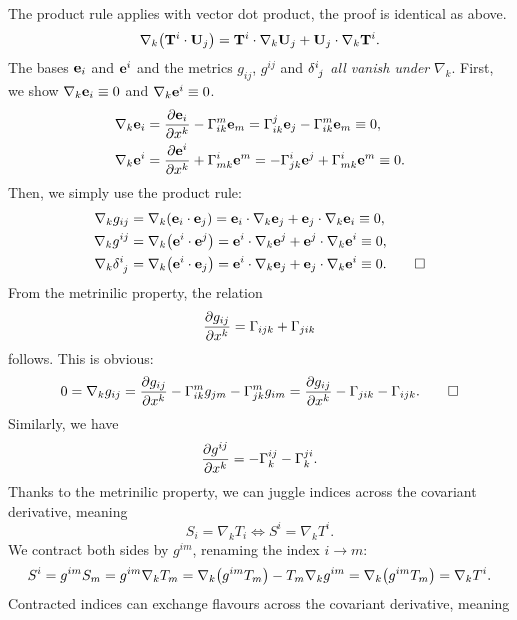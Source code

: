 \documentclass{article}
\begin{document}
 The product rule applies with vector dot product, the proof is identical as above.
\[
\nabla_{k} \qty(\vb{T}^{i} \cdot \vb{U}_{j}) = \vb{T}^{i} \cdot \nabla_{k} \vb{U}_{j} + \vb{U}_{j} \cdot \nabla_{k} \vb{T}^{i}.
\]
 The bases $ \vb{e}_{i} $ and $ \vb{e}^{i} $ and the metrics $ g_{ij} $, $ g^{ij} $ and $ \delta\indices{^{i}_{j}} $ \textit{all vanish under} $ \nabla_{k} $.
\proof First, we show $ \nabla_{k} \vb{e}_{i} \equiv 0 $ and $ \nabla_{k} \vb{e}^{i} \equiv 0 $.
\begin{align*}
\nabla_{k} \vb{e}_{i} &= \pdv{\vb{e}_{i}}{x^{k}} - \Gamma^{m}_{ik} \vb{e}_{m} 
= \Gamma^{j}_{ik} \vb{e}_{j} - \Gamma^{m}_{ik} \vb{e}_{m} \equiv 0, \\
\nabla_{k} \vb{e}^{i} &= \pdv{\vb{e}^{i}}{x^{k}} + \Gamma^{i}_{mk} \vb{e}^{m} 
= - \Gamma^{i}_{jk} \vb{e}^{j} + \Gamma^{i}_{mk} \vb{e}^{m}  \equiv 0.
\end{align*}
Then, we simply use the product rule:
\begin{align*}
\nabla_{k} g_{ij} &= \nabla_{k} \qty(\vb{e}_{i} \cdot \vb{e}_{j}) = \vb{e}_{i} \cdot \nabla_{k} \vb{e}_{j} + \vb{e}_{j} \cdot \nabla_{k} \vb{e}_{i} \equiv 0, \\
\nabla_{k} g^{ij} &= \nabla_{k} \qty(\vb{e}^{i} \cdot \vb{e}^{j}) = \vb{e}^{i} \cdot \nabla_{k} \vb{e}^{j} + \vb{e}^{j} \cdot \nabla_{k} \vb{e}^{i} \equiv 0, \\
\nabla_{k} \delta\indices{^{i}_{j}} &= \nabla_{k} \qty(\vb{e}^{i} \cdot \vb{e}_{j}) = \vb{e}^{i} \cdot \nabla_{k} \vb{e}_{j} + \vb{e}_{j} \cdot \nabla_{k} \vb{e}^{i} \equiv 0. \qed
\end{align*}
\proposition From the metrinilic property, the relation
\[
\pdv{g_{ij}}{x^{k}} = \Gamma_{ijk} + \Gamma_{jik}
\]
follows. This is obvious:
\[
0 = \nabla_{k} g_{ij} = \pdv{g_{ij}}{x^{k}} - \Gamma^{m}_{ik} g_{jm} - \Gamma^{m}_{jk} g_{im}
= \pdv{g_{ij}}{x^{k}} - \Gamma_{jik} - \Gamma_{ijk}. \qed
\]
Similarly, we have
\[
\pdv{g^{ij}}{x^{k}} = - \Gamma^{ij}_{k} - \Gamma^{ji}_{k}.
\]
 Thanks to the metrinilic property, we can juggle indices across the covariant derivative, meaning
\[
S_{i} = \nabla_{k} T_{i} \Longleftrightarrow S^{i} = \nabla_{k} T^{i}.
\]
\proof We contract both sides by $ g^{im} $, renaming the index $ i \to m $:
\[
S^{i} = g^{im} S_{m} = g^{im} \nabla_{k} T_{m} = \nabla_{k} \qty(g^{im} T_{m}) - T_{m} \nabla_{k} g^{im} = \nabla_{k} \qty(g^{im} T_{m}) = \nabla_{k} T^{i}.
\]
 Contracted indices can exchange flavours across the covariant derivative, meaning
\end{document}
